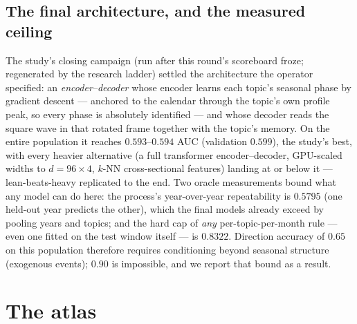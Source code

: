 \documentclass[11pt]{artaquest}
\begin{document}
\subsection*{The final architecture, and the measured ceiling}

The study's closing campaign (run after this round's scoreboard froze; regenerated by the
research ladder) settled the architecture the operator specified: an \emph{encoder--decoder}
whose encoder learns each topic's seasonal phase by gradient descent --- anchored to the
calendar through the topic's own profile peak, so every phase is absolutely identified --- and
whose decoder reads the square wave in that rotated frame together with the topic's memory. On
the entire population it reaches $0.593$--$0.594$ AUC (validation $0.599$), the study's best,
with every heavier alternative (a full transformer encoder--decoder, GPU-scaled widths to
$d=96{\times}4$, $k$-NN cross-sectional features) landing at or below it --- lean-beats-heavy
replicated to the end. Two oracle measurements bound what any model can do here: the process's
year-over-year repeatability is $0.5795$ (one held-out year predicts the other), which the final
models already exceed by pooling years and topics; and the hard cap of \emph{any}
per-topic-per-month rule --- even one fitted on the test window itself --- is $0.8322$.
Direction accuracy of $0.65$ on this population therefore requires conditioning beyond seasonal
structure (exogenous events); $0.90$ is impossible, and we report that bound as a result.

\section{The atlas}
\end{document}
